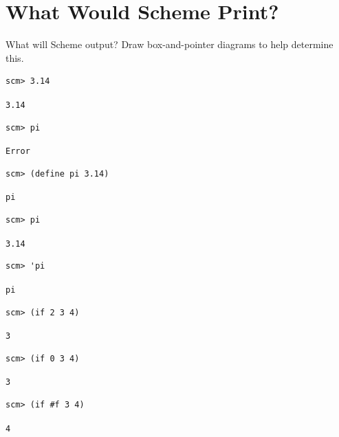 \documentclass{exam}
\begin{document}
\section{What Would Scheme Print?}
\begin{questions}
\begin{blocksection}
\question What will Scheme output? Draw box-and-pointer diagrams to help determine this.

\begin{lstlisting}
scm> 3.14
\end{lstlisting}
\begin{solution}[0.25in] 
\texttt{3.14}
\end{solution}

\begin{lstlisting}
scm> pi
\end{lstlisting}
\begin{solution}[0.25in]
\texttt{Error}
\end{solution}

\begin{lstlisting}
scm> (define pi 3.14)
\end{lstlisting}
\begin{solution}[0.25in]
\texttt{pi}
\end{solution}

\begin{lstlisting}
scm> pi
\end{lstlisting}
\begin{solution}[.25in]
\texttt{3.14}
\end{solution}

\begin{lstlisting}
scm> 'pi
\end{lstlisting}
\begin{solution}[.25in]
\texttt{pi}
\end{solution}

\begin{lstlisting}
scm> (if 2 3 4)
\end{lstlisting}
\begin{solution}[.25in]
\texttt{3}
\end{solution}

\begin{lstlisting}
scm> (if 0 3 4)
\end{lstlisting}
\begin{solution}[.25in]
\texttt{3}
\end{solution}

\begin{lstlisting}
scm> (if #f 3 4)
\end{lstlisting}
\begin{solution}[.25in]
\texttt{4}
\end{solution}


\end{blocksection}
\end{questions}
\end{document}
